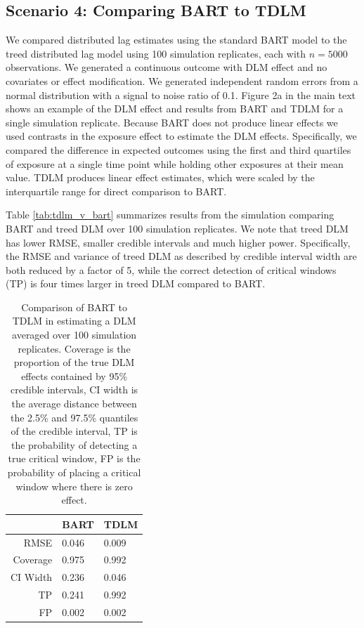 \documentclass[12pt]{article}
\begin{document}
\subsection{Scenario 4: Comparing BART to TDLM}
We compared distributed lag estimates using the standard BART model to the treed distributed lag model using 100 simulation replicates, each with $n=5000$ observations. We generated a continuous outcome with DLM effect and no covariates or effect modification. We generated independent random errors from a normal distribution with a signal to noise ratio of 0.1. Figure 2a in the main text shows an example of the DLM effect and results from BART and TDLM for a single simulation replicate. Because BART does not produce linear effects we used contrasts in the exposure effect to estimate the DLM effects. Specifically, we compared the difference in expected outcomes using the first and third quartiles of exposure at a single time point while holding other exposures at their mean value. TDLM produces linear effect estimates, which were scaled by the interquartile range for direct comparison to BART.

Table \ref{tab:tdlm_v_bart} summarizes results from the simulation comparing BART and treed DLM over 100 simulation replicates. We note that treed DLM has lower RMSE, smaller credible intervals and much higher power. Specifically, the RMSE and variance of treed DLM as described by credible interval width are both reduced by a factor of 5, while the correct detection of critical windows (TP) is four times larger in treed DLM compared to BART.


\begin{table}[!ht]
    \caption{Comparison of BART to TDLM in estimating a DLM averaged over 100 simulation replicates. Coverage is the proportion of the true DLM effects contained by 95\% credible intervals, CI width is the average distance between the 2.5\% and 97.5\% quantiles of the credible interval, TP is the probability of detecting a true critical window, FP is the probability of placing a critical window where there is zero effect.}
    \label{tab:hdlm_v_bart}
    \centering
    \begin{tabular}{rll}
    \toprule[2pt]
            & BART & TDLM\\
            \midrule
         RMSE & 0.046 & 0.009\\
         Coverage & 0.975 & 0.992\\
         CI Width & 0.236 & 0.046\\
         TP & 0.241 & 0.992\\
         FP & 0.002 & 0.002\\
         \bottomrule[2pt]
    \end{tabular}
\end{table}
\end{document}
